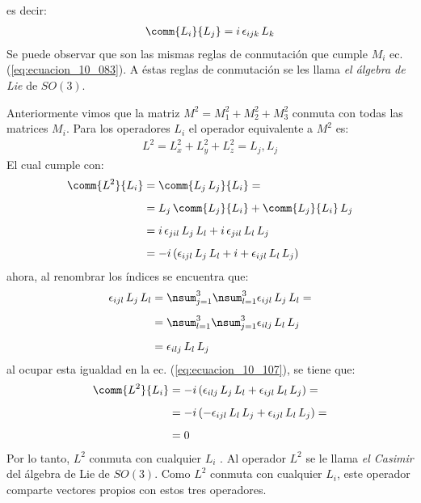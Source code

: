 es decir:
\begin{align}
\comm{L_{i}}{L_{j}} = i \, \epsilon_{ijk} \, L_{k}
\label{eq:ecuacion_10_105}
\end{align}
Se puede observar que son las mismas reglas de conmutación que cumple $M_{i}$ ec. (\ref{eq:ecuacion_10_083}). A éstas reglas de conmutación se les llama \emph{el álgebra de Lie} de $SO(3)$.
\par
Anteriormente vimos que la matriz $M^{2} = M_{1}^{2} + M_{2}^{2} + M_{3}^{2}$ conmuta con todas las matrices $M_{i}$. Para los operadores $L_{i}$ el operador equivalente a $M^{2}$ es:
\begin{align}
L^{2} = L_{x}^{2} + L_{y}^{2} + L_{z}^{2} = L_{j} , L_{j} 
\label{eq:ecuacion_10_106}
\end{align}
El cual cumple con:
\begin{align}
\begin{aligned}[b]
\comm{L^{2}}{L_{i}} &= \comm{L_{j} \, L_{j}}{L_{i}} = \\[0.5em]
&= L_{j} \, \comm{L_{j}}{L_{i}} + \comm{L_{j}}{L_{i}} \, L_{j} \\[0.5em]
&= i \, \epsilon_{jil} \, L_{j} \, L_{l} + i \, \epsilon_{jil} \, L_{l} \, L_{j} \\[0.5em]
&= - i \, (\epsilon_{ijl} \, L_{j} \, L_{l} + i + \epsilon_{ijl} \, L_{l} \, L_{j})
\end{aligned}
\label{eq:ecuacion_10_107}
\end{align}
ahora, al renombrar los índices se encuentra que:
\begin{align}
\begin{aligned}[b]
\epsilon_{ijl} \, L_{j} \, L_{l} &= \nsum_{j=1}^{3} \nsum_{l=1}^{3} \epsilon_{ijl} \, L_{j} \, L_{l} = \\[0.5em]
&= \nsum_{l=1}^{3} \nsum_{j=1}^{3} \epsilon_{ilj} \, L_{l} \, L_{j} \\[0.5em]
&= \epsilon_{ilj} \, L_{l} \, L_{j}
\end{aligned}
\label{eq:ecuacion_10_108}
\end{align}
al ocupar esta igualdad en la ec. (\ref{eq:ecuacion_10_107}), se tiene que:
\begin{align}
\begin{aligned}
\comm{L^{2}}{L_{i}} &= - i \, (\epsilon_{ilj} \, L_{j} \, L_{l} + \epsilon_{ijl} \, L_{l} \, L_{j}) = \\[0.5em]
&= - i \, (- \epsilon_{ijl} \, L_{l} \, L_{j} + \epsilon_{ijl} \, L_{l} \, L_{j}) = \\[0.5em]
&= 0
\end{aligned}
\label{eq:ecuacion_10_109}
\end{align}
Por lo tanto, $L^{2}$ conmuta con cualquier $L_{i}$ . Al operador $L^{2}$ se le llama \emph{el Casimir} del álgebra de Lie de $SO(3)$. Como $L^{2}$ conmuta con cualquier $L_{i}$, este operador comparte vectores propios con estos tres operadores.

